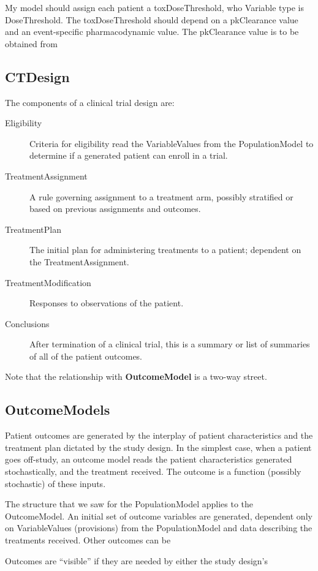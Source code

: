 \documentclass[12pt]{amsart}
\def\code<#1>{\textbf{#1}}
\begin{document}
My model should assign each patient a toxDoseThreshold, who Variable type is DoseThreshold.
The toxDoseThreshold should depend on a pkClearance value and an event-specific 
pharmacodynamic value.
The pkClearance value is to be obtained from 


\subsection{ CTDesign}

The components of a clinical trial design are:
\begin{description}
\item[ Eligibility] Criteria for eligibility read the VariableValues from the PopulationModel to determine if a generated patient can enroll in a trial.
\item[ TreatmentAssignment] A rule governing assignment to a treatment arm, possibly stratified or based on previous assignments and outcomes.
\item[ TreatmentPlan]  The initial plan for administering treatments to a patient; dependent on the TreatmentAssignment.
\item[ TreatmentModification] Responses to observations of the patient.
\item[ Conclusions] After termination of a clinical trial, this is a summary or list of summaries of all of the patient outcomes. 
\end{description}

Note that the relationship with \code<OutcomeModel> is a two-way street.


\subsection{ OutcomeModels}

Patient outcomes are generated
by the interplay of patient characteristics and the treatment plan
dictated by the study design.
In the simplest case, 
when a patient goes off-study,
an outcome  model reads the patient characteristics generated stochastically,
and the treatment received.
The outcome is a function (possibly stochastic)
of these inputs.


The structure that we saw for the PopulationModel applies to the OutcomeModel.
An initial set of outcome variables are generated,
dependent only on VariableValues (provisions) from the PopulationModel
and data describing the treatments received.
Other outcomes can be 

Outcomes are  ``visible'' if they are needed by either
the study design's 
\end{document}
